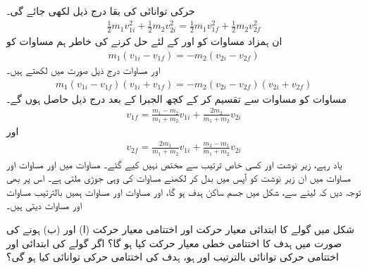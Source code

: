 حرکی توانائی کی بقا درج ذیل لکھی جائے گی۔
\begin{align}\label{مساوات_مرکز_کمیت_حرکی_توانائی_کی_بقا}
\frac{1}{2}m_1v_{1i}^2+\frac{1}{2}m_2v_{2i}^2=\frac{1}{2}m_1v_{1f}^2+\frac{1}{2}m_2v_{2f}^2
\end{align}
ان ہمزاد  مساوات کو  اور  کے لئے حل کرنے کی خاطر  ہم مساوات  کو
\begin{align}\label{مساوات_مرکز_کمیت_بقا_معار_دوم}
m_1(v_{1i}-v_{1f})=-m_2(v_{2i}-v_{2f})
\end{align}
اور مساوات  درج ذیل صورت میں لکھتے ہیں۔
\begin{align}\label{مساوات_مرکز_کمیت_بقا_دوم}
m_1(v_{1i}-v_{1f})(v_{1i}+v_{1f})=-m_2(v_{2i}-v_{2f})(v_{2i}+v_{2f})
\end{align}
مساوات  کو مساوات  سے تقسیم کر کے کچھ الجبرا کے بعد درج ذیل حاصل ہوں گے۔
\begin{align}\label{مساوات_مرکز_کمیت_اختتامی_الف}
v_{1f}=\frac{m_1-m_2}{m_1+m_2}v_{1i}+\frac{2m_2}{m_1+m_2}v_{2i}
\end{align}
اور
\begin{align}\label{مساوات_مرکز_کمیت_اختتامی_ب}
v_{2f}=\frac{2m_1}{m_1+m_2}v_{1i}+\frac{m_2-m_1}{m_1+m_2}v_{2i}
\end{align}
یاد رہے، زیر نوشت  اور  کسی خاص ترتیب سے مختص نہیں کیے گئے۔  مساوات  میں  اور مساوات  اور مساوات   میں  ان زیر نوشت کو آپس میں بدل کر لکھنے  مساوات کی وہی جوڑی ملتی ہے۔ اس پر بھی توجہ دیں کہ   لینے سے، شکل  میں جسم  ساکن ہدف ہو گا، اور مساوات   اور مساوات  ہمیں  بالترتیب مساوات  اور مساوات  دیتی ہیں۔ 



شکل  میں گولے کا ابتدائی معیار حرکت  اور اختتامی معیار حرکت (ا)   اور (ب)  ہونے کی صورت میں   ہدف کا  اختتامی خطی معیار حرکت کیا ہو گا؟ اگر گولے کی  ابتدائی اور  اختتامی حرکی توانائی بالترتیب   اور  ہو، ہدف کی اختتامی حرکی توانائی کیا ہو گی؟

